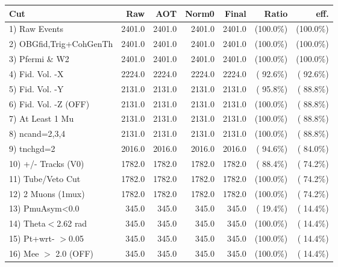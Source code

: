  \begin{table}[h!]\centering
 \begin{tabular}{||l||r|r|r|r|r|r||}
 \hline
 \hline
 Cut & Raw & AOT & Norm0 & Final & Ratio & eff.       \\
 \hline
  1) Raw Events           &       2401.0 &       2401.0 &       2401.0 &       2401.0 & (100.0\%) & (100.0\%) \\
  2) OBGfid,Trig+CohGenTh &       2401.0 &       2401.0 &       2401.0 &       2401.0 & (100.0\%) & (100.0\%) \\
  3) Pfermi \& W2         &       2401.0 &       2401.0 &       2401.0 &       2401.0 & (100.0\%) & (100.0\%) \\
  4) Fid. Vol. -X         &       2224.0 &       2224.0 &       2224.0 &       2224.0 & ( 92.6\%) & ( 92.6\%) \\
  5) Fid. Vol. -Y         &       2131.0 &       2131.0 &       2131.0 &       2131.0 & ( 95.8\%) & ( 88.8\%) \\
  6) Fid. Vol. -Z (OFF)   &       2131.0 &       2131.0 &       2131.0 &       2131.0 & (100.0\%) & ( 88.8\%) \\
  7) At Least 1 Mu        &       2131.0 &       2131.0 &       2131.0 &       2131.0 & (100.0\%) & ( 88.8\%) \\
  8) ncand=2,3,4          &       2131.0 &       2131.0 &       2131.0 &       2131.0 & (100.0\%) & ( 88.8\%) \\
  9) tnchgd=2             &       2016.0 &       2016.0 &       2016.0 &       2016.0 & ( 94.6\%) & ( 84.0\%) \\
 10) +/- Tracks (V0)      &       1782.0 &       1782.0 &       1782.0 &       1782.0 & ( 88.4\%) & ( 74.2\%) \\
 11) Tube/Veto Cut        &       1782.0 &       1782.0 &       1782.0 &       1782.0 & (100.0\%) & ( 74.2\%) \\
 12) 2 Muons (1mux)       &       1782.0 &       1782.0 &       1782.0 &       1782.0 & (100.0\%) & ( 74.2\%) \\
 13) PmuAsym<0.0          &        345.0 &        345.0 &        345.0 &        345.0 & ( 19.4\%) & ( 14.4\%) \\
 14) Theta$<$2.62 rad     &        345.0 &        345.0 &        345.0 &        345.0 & (100.0\%) & ( 14.4\%) \\
 15) Pt+wrt- $>$0.05      &        345.0 &        345.0 &        345.0 &        345.0 & (100.0\%) & ( 14.4\%) \\
 16) Mee $>$ 2.0  (OFF)   &        345.0 &        345.0 &        345.0 &        345.0 & (100.0\%) & ( 14.4\%) \\

\end{tabular}
\end{table}
